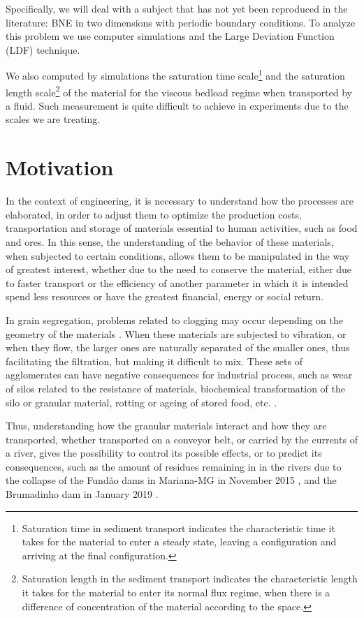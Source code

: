     Specifically, we will deal with a subject that has not yet been reproduced in the literature: BNE in two dimensions with periodic boundary conditions. To analyze this problem we use computer simulations and the Large Deviation Function (LDF) \cite{Large_Deviations_in_Physics} technique.

    We also computed by simulations the saturation time scale\footnote{Saturation time in sediment transport indicates the characteristic time it takes for the material to enter a steady state, leaving a configuration and arriving at the final configuration.} and the saturation length scale\footnote{Saturation length in the sediment transport indicates the characteristic length it takes for the material to enter its normal flux regime, when there is a difference of concentration of the material according to the space.} of the material for the viscous bedload regime when transported by a fluid. Such measurement is quite difficult to achieve in experiments due to the scales we are treating.

\section{Motivation}
\label{sec:motivacao}
    In the context of engineering, it is necessary to understand how the processes are elaborated, in order to adjust them to optimize the production costs, transportation and storage of materials essential to human activities, such as food and ores. In this sense, the understanding of the behavior of these materials, when subjected to certain conditions, allows them to be manipulated in the way of greatest interest, whether due to the need to conserve the material, either due to faster transport or the efficiency of another parameter in which it is intended spend less resources or have the greatest financial, energy or social return.

    In grain segregation, problems related to clogging may occur depending on the geometry of the materials \cite{Caio-Tese}. When these materials are subjected to vibration, or when they flow, the larger ones are naturally separated of the smaller ones, thus facilitating the filtration, but making it difficult to mix. These sets of agglomerates can have negative consequences for industrial process, such as wear of silos related to the resistance of materials, biochemical transformation of the silo or granular material, rotting or ageing of stored food, etc. \cite{Silo_failures}.

    Thus, understanding how the granular materials interact and how they are transported, whether transported on a conveyor belt, or carried by the currents of a river, gives the possibility to control its possible effects, or to predict its consequences, such as the amount of residues remaining in in the rivers due to the collapse of the Fundão dams in Mariana-MG in November 2015 \cite{Mariana_en, Mariana_pt, Mariana_fr}, and the Brumadinho dam in January 2019 \cite{Brumadinho_en, Brumadinho_pt, Brumadinho_fr}.

